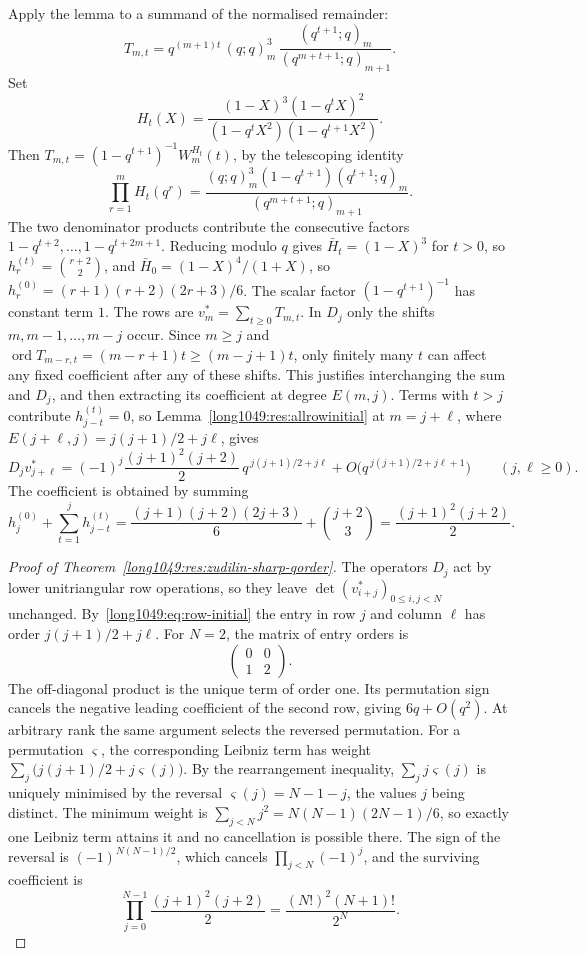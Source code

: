 \noindent Apply the lemma to a summand of the normalised remainder:
\[
 T_{m,t}=q^{(m+1)t}\,(q;q)_m^{3}\,\frac{(q^{t+1};q)_m}{(q^{m+t+1};q)_{m+1}} .
\]
Set
\[
 H_t(X)=\frac{(1-X)^{3}(1-q^{t}X)^{2}}{(1-q^{t}X^{2})(1-q^{t+1}X^{2})}.
\]
Then $T_{m,t}=(1-q^{t+1})^{-1}W_m^{H_t}(t)$, by the telescoping identity
\[
 \prod_{r=1}^{m}H_t(q^r)=
 \frac{(q;q)_m^3(1-q^{t+1})(q^{t+1};q)_m}{(q^{m+t+1};q)_{m+1}}.
\]
The two denominator products contribute the consecutive factors
$1-q^{t+2},\ldots,1-q^{t+2m+1}$.
Reducing modulo $q$ gives $\bar H_t=(1-X)^{3}$ for $t>0$, so
$h^{(t)}_r=\binom{r+2}{2}$, and $\bar H_0=(1-X)^{4}/(1+X)$, so
$h^{(0)}_r=(r+1)(r+2)(2r+3)/6$. The scalar factor
$(1-q^{t+1})^{-1}$ has constant term $1$. The rows are $v_m^*=\sum_{t\ge0}T_{m,t}$. In $D_j$ only the shifts
$m,m-1,\ldots,m-j$ occur. Since $m\ge j$ and
$\operatorname{ord}T_{m-r,t}=(m-r+1)t\ge(m-j+1)t$, only finitely many
$t$ can affect any fixed coefficient after any of these shifts.
This justifies interchanging the sum and $D_j$, and then extracting its
coefficient at degree $E(m,j)$. Terms with $t>j$ contribute
$h^{(t)}_{j-t}=0$, so Lemma~\ref{long1049:res:allrowinitial} at
$m=j+\ell$, where $E(j+\ell,j)=j(j+1)/2+j\ell$, gives
\begin{equation}\label{long1049:eq:row-initial}
 D_jv_{j+\ell}^*=(-1)^{j}\frac{(j+1)^{2}(j+2)}2\,q^{\,j(j+1)/2+j\ell}
 +O\bigl(q^{\,j(j+1)/2+j\ell+1}\bigr)
 \qquad(j,\ell\ge0).
\end{equation}
The coefficient is obtained by summing
\[
 h^{(0)}_j+\sum_{t=1}^{j}h^{(t)}_{j-t}
 =\frac{(j+1)(j+2)(2j+3)}6+\binom{j+2}3
 =\frac{(j+1)^{2}(j+2)}2 .
\]

\begin{proof}[Proof of Theorem~\ref{long1049:res:zudilin-sharp-qorder}]
The operators $D_j$ act by lower unitriangular row operations, so they leave
$\det(v_{i+j}^*)_{0\le i,j<N}$ unchanged.  By~\eqref{long1049:eq:row-initial} the entry in
row $j$ and column $\ell$ has order $j(j+1)/2+j\ell$. For $N=2$,
the matrix of entry orders is
\[
 \begin{pmatrix}0&0\\1&2\end{pmatrix}.
\]
The off-diagonal product is the unique term of order one. Its
permutation sign cancels the negative leading coefficient of the second
row, giving $6q+O(q^2)$. At arbitrary rank the same argument selects
the reversed permutation. For a permutation $\varsigma$, the corresponding
Leibniz term has weight $\sum_j\bigl(j(j+1)/2+j\varsigma(j)\bigr)$.
By the rearrangement inequality, $\sum_jj\varsigma(j)$ is uniquely
minimised by the reversal
$\varsigma(j)=N-1-j$, the values $j$ being distinct. The minimum weight is
$\sum_{j<N}j^{2}=N(N-1)(2N-1)/6$, so exactly one Leibniz term attains it and no
cancellation is possible there. The sign of the reversal is
$(-1)^{N(N-1)/2}$, which cancels $\prod_{j<N}(-1)^{j}$, and the surviving
coefficient is
\[
 \prod_{j=0}^{N-1}\frac{(j+1)^{2}(j+2)}2=\frac{(N!)^{2}(N+1)!}{2^{N}} .
\]
\end{proof}

